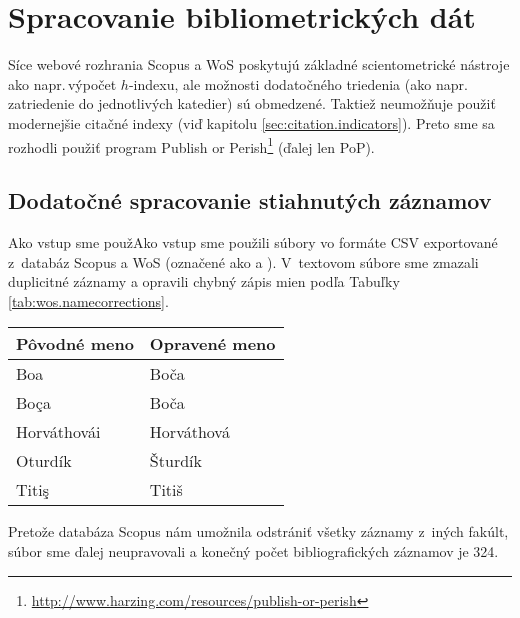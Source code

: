 \section{Spracovanie bibliometrických dát}

Síce webové rozhrania Scopus a WoS poskytujú základné scientometrické nástroje
ako napr.\,výpočet $h$-indexu, ale možnosti dodatočného triedenia (ako
napr.\,zatriedenie do jednotlivých katedier) sú obmedzené.  Taktiež neumožňuje
použiť modernejšie citačné indexy (viď kapitolu \ref{sec:citation.indicators}).
Preto sme sa rozhodli použiť program Publish or
Perish\footnote{\url{http://www.harzing.com/resources/publish-or-perish}} (ďalej
len PoP).


\subsection{Dodatočné spracovanie stiahnutých záznamov}

Ako vstup sme použAko vstup sme použili súbory vo formáte CSV exportované
z~databáz Scopus a WoS (označené ako  a
).  V~textovom súbore
 sme zmazali duplicitné záznamy a opravili
chybný zápis mien podľa Tabuľky \ref{tab:wos.namecorrections}.

\begin{SCtable}
\caption{Oprava chýb v~menách autorov v~súbore .}
\label{tab:wos.namecorrections}
\centering\small
\begin{tabular}{ll}
  \toprule\noalign{\vspace{.3ex}}
  Pôvodné meno & Opravené meno \\[0.3ex]
  \midrule\noalign{\vspace{.5ex}}
  Boa          & Boča       \\
  Boça         & Boča       \\
  Horváthovái  & Horváthová \\
  Oturdík      & Šturdík    \\
  Titiş        & Titiš      \\[0.5ex]
  \bottomrule
\end{tabular}
\end{SCtable}

Pretože databáza Scopus nám umožnila odstrániť všetky záznamy z~iných fakúlt,
súbor  sme ďalej neupravovali a konečný počet
bibliografických záznamov je 324.

